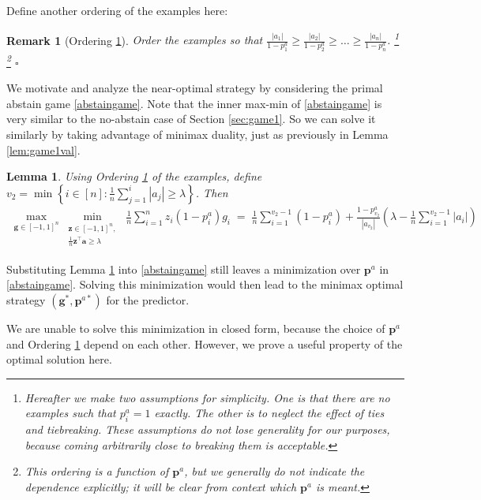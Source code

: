 \documentclass{article}[12pt]
\newtheorem{lem}[thm]{Lemma}
\theoremstyle{named}
\newtheorem{nremark}{Remark}
\newcommand{\va}{\mathbf{a}}
\newcommand{\vg}{\mathbf{g}}    %
\newcommand{\vp}{\mathbf{p}}
\newcommand{\vz}{\mathbf{z}}
\newcommand{\abs}[1]{\left| #1 \right|}
\newcommand*{\qedinpw}{\hfill\ensuremath{\square}} %
\newcommand{\lrp}[1]{\left(#1\right)}
\begin{document}
Define another ordering of the examples here: 
\begin{nremark}[Ordering \ref{remark:abstorder}]
\label{remark:abstorder}
Order the examples so that 
$\displaystyle \frac{\abs{a_1}}{1 - p_1^a} \geq \frac{\abs{a_2}}{1 - p_2^a} \geq \dots \geq \frac{\abs{a_n}}{1 - p_n^a}$.
\footnote{
Hereafter we make two assumptions for simplicity. 
One is that there are no examples such that $p_i^a = 1$ exactly. 
The other is to neglect the effect of ties and tiebreaking.
These assumptions do not lose generality for our purposes, 
because coming arbitrarily close to breaking them is acceptable.}
\footnote{
This ordering is a function of $\vp^a$, but we generally do not indicate the dependence explicitly; 
it will be clear from context which $\vp^a$ is meant.}
\qedinpw
\end{nremark}

We motivate and analyze the near-optimal strategy by considering the primal abstain game \eqref{abstaingame}.
Note that the inner max-min of \eqref{abstaingame} is very similar to the no-abstain case of Section \ref{sec:game1}. 
So we can solve it similarly by taking advantage of minimax duality, 
just as previously in Lemma \ref{lem:game1val}.

\begin{lem}
\label{lem:innergameabsval}
Using Ordering \ref{remark:abstorder} of the examples, 
define $v_2 = \min \left\{ i \in [n] : \frac{1}{n} \sum_{j=1}^i \abs{a_j} \geq \lambda \right\}$. 
Then 
\begin{align*}
\max_{\vg \in [-1,1]^n} \min_{\substack{ \vz \in [-1,1]^n , \\ \frac{1}{n} \vz^\top \va \geq \lambda }}\; \frac{1}{n} \sum_{i=1}^n z_i \lrp{1 - p_i^a} g_i \;
=\; \frac{1}{n} \sum_{i=1}^{v_2 - 1} \lrp{1 - p_i^a} + \frac{1 - p_{v_2}^a}{\abs{a_{v_2}}} \lrp{ \lambda - \frac{1}{n} \sum_{i=1}^{v_2 - 1} \abs{a_i} }
\end{align*}
\end{lem}

Substituting Lemma \ref{lem:innergameabsval} into \eqref{abstaingame} 
still leaves a minimization over $\vp^a$ in \eqref{abstaingame}. 
Solving this minimization
would then lead to the minimax optimal strategy $(\vg^*, \vp^{a*})$ for the predictor. 

We are unable to solve this minimization in closed form, 
because the choice of $\vp^a$ and Ordering \ref{remark:abstorder} depend on each other. 
However, we prove a useful property of the optimal solution here.
\end{document}
